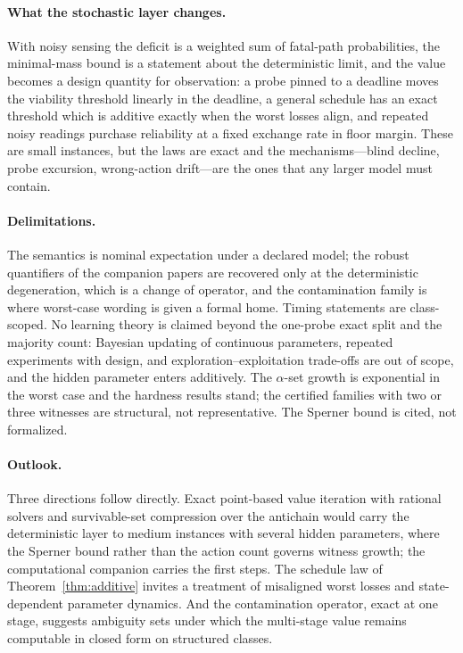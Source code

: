 \documentclass[11pt,a4paper]{article}
\theoremstyle{plain}
\theoremstyle{definition}
\theoremstyle{remark}
\begin{document}
\paragraph{What the stochastic layer changes.}
With noisy sensing the deficit is a weighted sum of fatal-path probabilities, the minimal-mass bound is a statement about the deterministic limit, and the value becomes a design quantity for observation: a probe pinned to a deadline moves the viability threshold linearly in the deadline, a general schedule has an exact threshold which is additive exactly when the worst losses align, and repeated noisy readings purchase reliability at a fixed exchange rate in floor margin. These are small instances, but the laws are exact and the mechanisms---blind decline, probe excursion, wrong-action drift---are the ones that any larger model must contain.

\paragraph{Delimitations.}
The semantics is nominal expectation under a declared model; the robust quantifiers of the companion papers are recovered only at the deterministic degeneration, which is a change of operator, and the contamination family is where worst-case wording is given a formal home. Timing statements are class-scoped. No learning theory is claimed beyond the one-probe exact split and the majority count: Bayesian updating of continuous parameters, repeated experiments with design, and exploration--exploitation trade-offs are out of scope, and the hidden parameter enters additively. The $\alpha$-set growth is exponential in the worst case and the hardness results stand; the certified families with two or three witnesses are structural, not representative. The Sperner bound is cited, not formalized.

\paragraph{Outlook.}
Three directions follow directly. Exact point-based value iteration with rational solvers and survivable-set compression over the antichain would carry the deterministic layer to medium instances with several hidden parameters, where the Sperner bound rather than the action count governs witness growth; the computational companion \cite{Abaee2026cert} carries the first steps. The schedule law of Theorem~\ref{thm:additive} invites a treatment of misaligned worst losses and state-dependent parameter dynamics. And the contamination operator, exact at one stage, suggests ambiguity sets under which the multi-stage value remains computable in closed form on structured classes.
\end{document}
